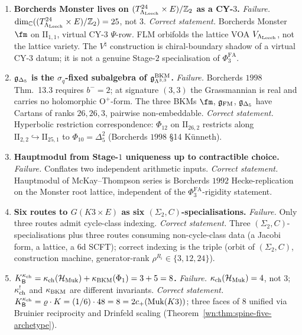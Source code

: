 \begin{theorem}
\begin{enumerate}
\item \textbf{Borcherds Monster lives on $(T^{24}_{\Lambda_{\mathrm{Leech}}}\times E)/
\mathbb{Z}_2$ as a CY-$3$.}
\emph{Failure.} $\dim_{\mathbb{C}}((T^{24}_{\Lambda_{\mathrm{Leech}}}\times E)/\mathbb{Z}_2) = 25$, not
$3$.
\emph{Correct statement.} Borcherds Monster $\fm$ on $\mathrm{II}_{1,1}$, virtual
CY-$3$ $\Psi$-row. FLM orbifolds the lattice VOA $V_{\Lambda_{\mathrm{Leech}}}$, not
the lattice variety. The $V^\natural$ construction is chiral-boundary
shadow of a virtual CY-$3$ datum; it is not a genuine Stage-$2$
specialisation of $\Phi^{\mathrm{FA}}_3$.

\item \textbf{$\mathfrak{g}_{\Delta_5}$ is the $\sigma_q$-fixed subalgebra of
$\mathfrak{g}^{\mathrm{BKM}}_{\Lambda^{3,3}}$.}
\emph{Failure.} Borcherds $1998$ Thm.~13.3 requires $b^- = 2$; at
signature $(3, 3)$ the Grassmannian is real and carries no
holomorphic $\mathrm{O}^+$-form. The three BKMs $\fm$, $\mathfrak{g}_{\mathrm{FM}}$,
$\mathfrak{g}_{\Delta_5}$ have Cartans of ranks $26, 26, 3$, pairwise
non-embeddable.
\emph{Correct statement.} Hyperbolic restriction correspondence: $\Phi_{12}$ on
$\mathrm{II}_{26,2}$ restricts along $\mathrm{II}_{2,2}
\hookrightarrow \mathrm{II}_{25,1}$ to $\Phi_{10} = \Delta_5^2$
(Borcherds $1998$ \S 14 K\"unneth).

\item \textbf{Hauptmodul from Stage-$1$ uniqueness up to contractible
choice.}
\emph{Failure.} Conflates two independent arithmetic inputs.
\emph{Correct statement.} Hauptmodul of McKay--Thompson series is Borcherds $1992$
Hecke-replication on the Monster root lattice, independent of the
$\Phi^{\mathrm{FA}}_3$-rigidity statement.

\item \textbf{Six routes to $G(K3 \times E)$ as six
$(\Sigma_2, C)$-specialisations.}
\emph{Failure.} Only three routes admit cycle-class indexing.
\emph{Correct statement.} Three $(\Sigma_2, C)$-specialisations plus three routes
consuming non-cycle-class data (a Jacobi form, a lattice, a 6d
SCFT); correct indexing is the triple (orbit of $(\Sigma_2, C)$,
construction machine, generator-rank $\rho^{R_i} \in \{3, 12, 24\}$).

\item \textbf{$K^{\kappa_{\mathrm{ch}}}_\mathsf{B} =
\kappa_{\mathrm{ch}}(\mathcal{H}_{\mathrm{Muk}}) + \kappa_{\mathrm{BKM}}(\Phi_1) = 3 + 5 = 8$.}
\emph{Failure.} $\kappa_{\mathrm{ch}}(\mathcal{H}_{\mathrm{Muk}}) = 4$, not $3$; $\kappa_{\mathrm{ch}}^!$ and
$\kappa_{\mathrm{BKM}}$ are different invariants.
\emph{Correct statement.} $K^{\kappa_{\mathrm{ch}}}_\mathsf{B} = \varrho \cdot K = (1/6)\cdot 48
= 8 = 2c_+(\mathrm{Muk}(K3))$; three faces of $8$ unified via Bruinier
reciprocity and Drinfeld scaling
(Theorem~\ref{wn:thm:spine-five-archetype}).


\end{enumerate}
\end{theorem}
